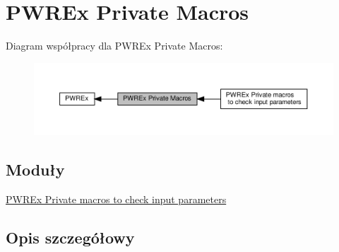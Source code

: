\hypertarget{group___p_w_r_ex___private___macros}{}\section{P\+W\+R\+Ex Private Macros}
\label{group___p_w_r_ex___private___macros}
Diagram współpracy dla P\+W\+R\+Ex Private Macros\+:\nopagebreak
\begin{figure}[H]
\begin{center}
\leavevmode
\includegraphics[width=350pt]{group___p_w_r_ex___private___macros}
\end{center}
\end{figure}
\subsection*{Moduły}
\begin{DoxyCompactItemize}
\item 
\hyperlink{group___p_w_r_ex___i_s___p_w_r___definitions}{P\+W\+R\+Ex Private macros to check input parameters}
\end{DoxyCompactItemize}


\subsection{Opis szczegółowy}
